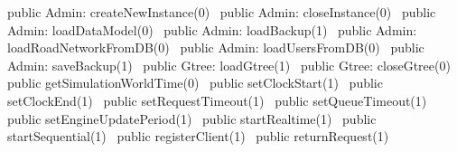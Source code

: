 public \LA{}Admin: createNewInstance(0)~{\nwtagstyle{}}\RA{}
public \LA{}Admin: closeInstance(0)~{\nwtagstyle{}}\RA{}
public \LA{}Admin: loadDataModel(0)~{\nwtagstyle{}}\RA{}
public \LA{}Admin: loadBackup(1)~{\nwtagstyle{}}\RA{}
public \LA{}Admin: loadRoadNetworkFromDB(0)~{\nwtagstyle{}}\RA{}
public \LA{}Admin: loadUsersFromDB(0)~{\nwtagstyle{}}\RA{}
public \LA{}Admin: saveBackup(1)~{\nwtagstyle{}}\RA{}
public \LA{}Gtree: loadGtree(1)~{\nwtagstyle{}}\RA{}
public \LA{}Gtree: closeGtree(0)~{\nwtagstyle{}}\RA{}
public \LA{}getSimulationWorldTime(0)~{\nwtagstyle{}}\RA{}
public \LA{}setClockStart(1)~{\nwtagstyle{}}\RA{}
public \LA{}setClockEnd(1)~{\nwtagstyle{}}\RA{}
public \LA{}setRequestTimeout(1)~{\nwtagstyle{}}\RA{}
public \LA{}setQueueTimeout(1)~{\nwtagstyle{}}\RA{}
public \LA{}setEngineUpdatePeriod(1)~{\nwtagstyle{}}\RA{}
public \LA{}startRealtime(1)~{\nwtagstyle{}}\RA{}
public \LA{}startSequential(1)~{\nwtagstyle{}}\RA{}
public \LA{}registerClient(1)~{\nwtagstyle{}}\RA{}
public \LA{}returnRequest(1)~{\nwtagstyle{}}\RA{}
\nwendcode{}\nwdocspar

